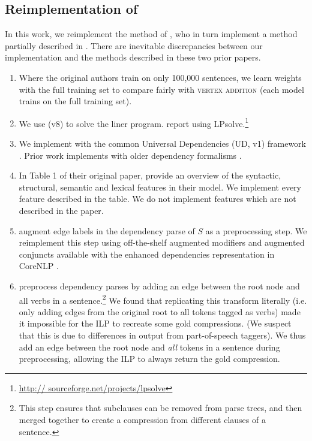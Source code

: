 \subsection{Reimplementation of \citet{filippova2013overcoming}}

In this work, we reimplement the method of \citet{filippova2013overcoming}, who in turn implement a method partially described in \citet{filippova2008dependency}.  There are inevitable discrepancies between our implementation and the methods described in these two prior papers.

\begin{enumerate}
\item{Where the original authors train on only 100,000 sentences, we learn weights with the full training set to compare fairly with \textsc{vertex addition} (each model trains on the full training set).}
\item{We use \citet{gurobi} (v8) to solve the liner program. \citet{filippova2008dependency} report using LPsolve.\footnote{\url{http://
sourceforge.net/projects/lpsolve}}}
\item{We implement with the common Universal Dependencies (UD, v1) framework \cite{Nivre2016UniversalDV}. Prior work \cite{filippova2008dependency} implements with older dependency formalisms \cite{briscoe-etal-2006-second,Marneffe2006GeneratingTD}.} 
\item{In Table 1 of their original paper, \citet{filippova2013overcoming} provide an overview of the syntactic, structural, semantic and lexical features in their model. We implement every feature described in the table. We do not implement features which are not described in the paper.}
\item{\citet{filippova2013overcoming} augment edge labels in the dependency parse of $S$ as a preprocessing step. We reimplement this step using off-the-shelf augmented modifiers and augmented conjuncts available with the enhanced dependencies representation in CoreNLP \cite{Schuster2016EnhancedEU}.}
\item{\citet{filippova2013overcoming} preprocess dependency parses by adding an edge between the root node and all verbs in a sentence.\footnote{This step ensures that subclauses can be removed from parse trees, and then merged together to create a compression from different clauses of a sentence.} We found that replicating this transform literally (i.e. only adding edges from the original root to all tokens tagged as verbs) made it impossible for the ILP to recreate some gold compressions. (We suspect that this is due to differences in output from part-of-speech taggers). We thus add an edge between the root node and \textit{all} tokens in a sentence during preprocessing, allowing the ILP to always return the gold compression.}
\end{enumerate}


